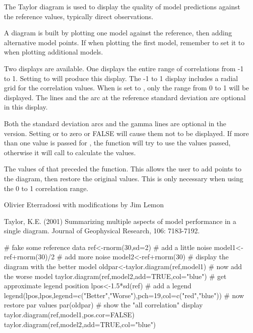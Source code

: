 \begin{Details}\relax
The Taylor diagram is used to display the quality of model predictions
against the reference values, typically direct observations.

A diagram is built by plotting one model against the reference,
then adding alternative model points. If  
when plotting the first model, remember to set it to 
when plotting additional models.

Two displays are available. One displays the entire range of correlations
from -1 to 1. Setting  to  will produce this
display. The -1 to 1 display includes a radial grid for the correlation
values. When  is set to , only the
range from 0 to 1 will be displayed. The  lines and the arc at
the reference standard deviation are optional in this display.

Both the standard deviation arcs and the gamma lines are optional in the
 version. Setting  or 
to zero or FALSE will cause them not to be displayed. If more than one value is
passed for , the function will try to use the values passed,
otherwise it will call  to calculate the values.
\end{Details}
\begin{Value}
The values of  that preceded the function. This allows the
user to add points to the diagram, then restore the original values. This
is only necessary when using the 0 to 1 correlation range.
\end{Value}
\begin{Author}\relax
Olivier Eterradossi with modifications by Jim Lemon
\end{Author}
\begin{References}\relax
Taylor, K.E. (2001) Summarizing multiple aspects of model performance in a
single diagram. Journal of Geophysical Research, 106: 7183-7192.
\end{References}
\begin{Examples}
\begin{ExampleCode}
 # fake some reference data
 ref<-rnorm(30,sd=2)
 # add a little noise
 model1<-ref+rnorm(30)/2
 # add more noise
 model2<-ref+rnorm(30)
 # display the diagram with the better model
 oldpar<-taylor.diagram(ref,model1)
 # now add the worse model
 taylor.diagram(ref,model2,add=TRUE,col="blue")
 # get approximate legend position
 lpos<-1.5*sd(ref)
 # add a legend
 legend(lpos,lpos,legend=c("Better","Worse"),pch=19,col=c("red","blue"))
 # now restore par values
 par(oldpar)
 # show the "all correlation" display
 taylor.diagram(ref,model1,pos.cor=FALSE)
 taylor.diagram(ref,model2,add=TRUE,col="blue")
\end{ExampleCode}
\end{Examples}

